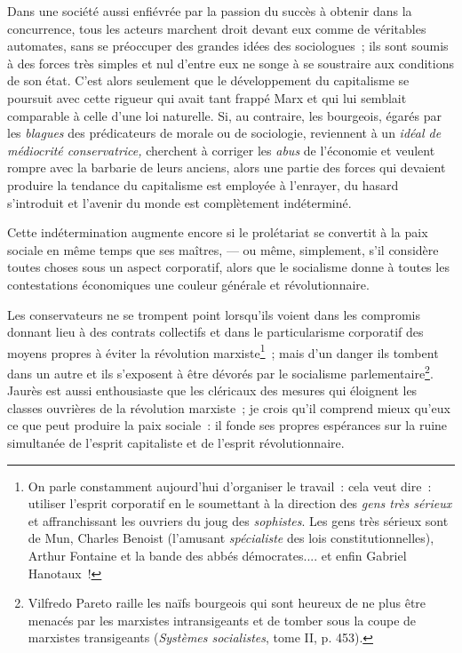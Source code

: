 \documentclass[french,twoside]{book} %
\begin{document}
Dans une société aussi enfiévrée par la passion du succès à obtenir dans la concurrence, tous les acteurs marchent droit devant eux comme de véritables automates, sans se préoccuper des grandes idées des sociologues ; ils sont soumis à des forces très simples et nul d’entre eux ne songe à se soustraire aux conditions de son état. C’est alors seulement que le développement du capitalisme se poursuit avec cette rigueur qui avait tant frappé Marx et qui lui semblait comparable à celle d’une loi naturelle. Si, au contraire, les bourgeois, égarés par les \emph{blagues} des prédicateurs de morale ou de sociologie, reviennent à un \emph{idéal de médiocrité conservatrice,} cherchent à corriger les \emph{abus} de l’économie et veulent rompre avec la barbarie de leurs anciens, alors une partie des forces qui devaient produire la tendance du capitalisme est employée à l’enrayer, du hasard s’introduit et l’avenir du monde est complètement indéterminé.\par
 Cette indétermination augmente encore si le prolétariat se convertit à la paix sociale en même temps que ses maîtres, — ou même, simplement, s’il considère toutes choses sous un aspect corporatif, alors que le socialisme donne à toutes les contestations économiques une couleur générale et révolutionnaire.\par
Les conservateurs ne se trompent point lorsqu’ils voient dans les compromis donnant lieu à des contrats collectifs et dans le particularisme corporatif des moyens propres à éviter la révolution marxiste\footnote{ \noindent On parle constamment aujourd’hui d’organiser le travail : cela veut dire : utiliser l’esprit corporatif en le soumettant à la direction des \emph{gens très sérieux} et affranchissant les ouvriers du joug des \emph{sophistes}. Les gens très sérieux sont de Mun, Charles Benoist (l’amusant \emph{spécialiste} des lois constitutionnelles), Arthur Fontaine et la bande des abbés démocrates.... et enfin Gabriel Hanotaux !
 } ; mais d’un danger ils tombent dans un autre et ils s’exposent à être dévorés par le socialisme parlementaire\footnote{ \noindent Vilfredo Pareto raille les naïfs bourgeois qui sont heureux de ne plus être menacés par les marxistes intransigeants et de tomber sous la coupe de marxistes transigeants (\emph{Systèmes socialistes}, tome II, p. 453).
 }. Jaurès est aussi enthousiaste que les cléricaux des mesures qui éloignent les classes ouvrières de la révolution marxiste ; je crois qu’il comprend mieux qu’eux ce que peut produire la paix sociale : il fonde ses propres espérances sur la ruine simultanée de l’esprit capitaliste et de l’esprit révolutionnaire.\par
\end{document}
